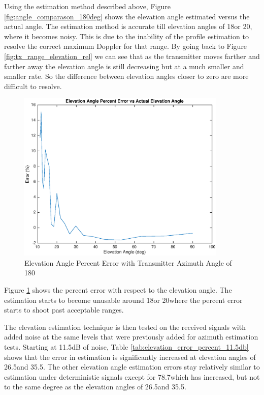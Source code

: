 Using the estimation method described above, Figure \ref{fig:angle_comparason_180deg} shows the elevation angle estimated versus the actual angle. The estimation method is accurate till elevation angles of 18\textdegree \space or 20\textdegree, where it becomes noisy. This is due to the inability of the profile estimation to resolve the correct maximum Doppler for that range. By going back to Figure \ref{fig:tx_range_elevation_rel} we can see that as the transmitter moves farther and farther away the elevation angle is still decreasing but at a much smaller and smaller rate. So the difference between elevation angles closer to zero are more difficult to resolve. 

\begin{figure}
	\begin{center}
		\includegraphics[width=10cm]{images/results/Elevation_angle_percent_error_180deg_Azimuth.eps}
		\caption{Elevation Angle Percent Error with Transmitter Azimuth Angle of 180\textdegree}
		\label{fig:percent_error_elevation_180deg}
	\end{center}
\end{figure}

Figure \ref{fig:percent_error_elevation_180deg} shows the percent error with respect to the elevation angle. The estimation starts to become unusable around 18\textdegree \space or 20\textdegree \space where the percent error starts to shoot past acceptable ranges.


The elevation estimation technique is then tested on the received signals with added noise at the same levels that were previously added for azimuth estimation tests. Starting at 11.5dB of noise, Table \ref{tab:elevation_error_percent_11.5db} shows that the error in estimation is significantly increased at elevation angles of 26.5\textdegree \space and 35.5\textdegree. The other elevation angle estimation errors stay relatively similar to estimation under deterministic signals except for 78.7\textdegree which has increased, but not to the same degree as the elevation angles of 26.5\textdegree \space and 35.5\textdegree.  

